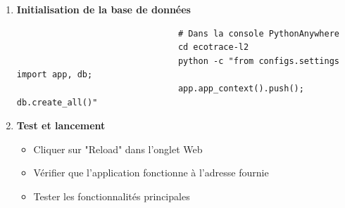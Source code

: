 \documentclass[a4paper,11pt]{article}
\begin{document}
\begin{enumerate}
                    \item \textbf{Initialisation de la base de données}
                        \begin{tcolorbox}[colback=lightgray!6, colframe=black, left=-50mm, right=5mm, top=2mm, bottom=0mm, boxrule=0.1mm]
                            \begin{verbatim}
                                # Dans la console PythonAnywhere
                                cd ecotrace-l2
                                python -c "from configs.settings import app, db; 
                                app.app_context().push(); db.create_all()"
                            \end{verbatim}
                        \end{tcolorbox}

                    \item \textbf{Test et lancement}
                        \begin{itemize}
                            \item Cliquer sur "Reload" dans l'onglet Web
                            \item Vérifier que l'application fonctionne à l'adresse fournie
                            \item Tester les fonctionnalités principales
                        \end{itemize}


\end{enumerate}
\end{document}

